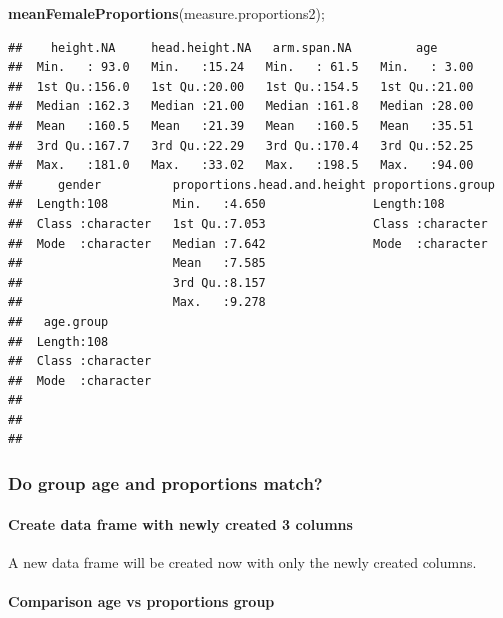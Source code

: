 \documentclass[]{article}
\newenvironment{Shaded}{\begin{snugshade}}{\end{snugshade}}
\newcommand{\KeywordTok}[1]{\textcolor[rgb]{0.13,0.29,0.53}{\textbf{#1}}}
\newcommand{\NormalTok}[1]{#1}
\begin{document}
\begin{Shaded}
\begin{Highlighting}[]
\KeywordTok{meanFemaleProportions}\NormalTok{(measure.proportions2);}
\end{Highlighting}
\end{Shaded}

\begin{verbatim}
##    height.NA     head.height.NA   arm.span.NA         age       
##  Min.   : 93.0   Min.   :15.24   Min.   : 61.5   Min.   : 3.00  
##  1st Qu.:156.0   1st Qu.:20.00   1st Qu.:154.5   1st Qu.:21.00  
##  Median :162.3   Median :21.00   Median :161.8   Median :28.00  
##  Mean   :160.5   Mean   :21.39   Mean   :160.5   Mean   :35.51  
##  3rd Qu.:167.7   3rd Qu.:22.29   3rd Qu.:170.4   3rd Qu.:52.25  
##  Max.   :181.0   Max.   :33.02   Max.   :198.5   Max.   :94.00  
##     gender          proportions.head.and.height proportions.group 
##  Length:108         Min.   :4.650               Length:108        
##  Class :character   1st Qu.:7.053               Class :character  
##  Mode  :character   Median :7.642               Mode  :character  
##                     Mean   :7.585                                 
##                     3rd Qu.:8.157                                 
##                     Max.   :9.278                                 
##   age.group        
##  Length:108        
##  Class :character  
##  Mode  :character  
##                    
##                    
## 
\end{verbatim}

\newpage

\subsubsection{Do group age and proportions match?}
\label{sec:appendix-group-age-vs-proportions}

\paragraph{Create data frame with newly created 3 columns}
\label{sec:appendix-new-proportions-df}

A new data frame will be created now with only the newly created
columns.

\paragraph{Comparison age vs proportions group}
\label{sec:appendix-comparison-age-vs-proportions-group}
\end{document}
